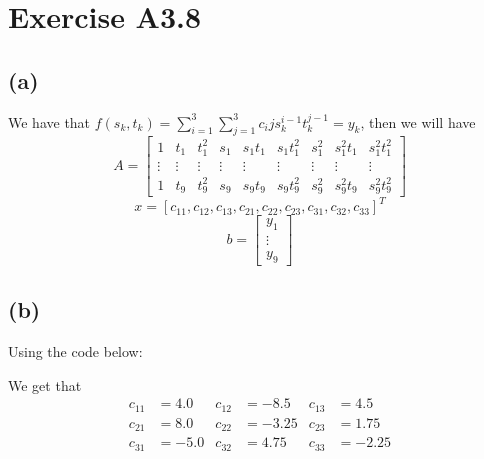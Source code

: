 \section*{Exercise A3.8}
\subsection*{(a)}
We have that $f(s_k,t_k)=\sum_{i=1}^{3}\sum_{j=1}^{3}c_ijs_k^{i-1}t_k^{j-1}=y_k$, then we will have
$$A=\begin{bmatrix}
    1&t_1&t_1^2&s_1&s_1t_1&s_1t_1^2&s_1^2&s_1^2t_1&s_1^2t_1^2\\
    \vdots & \vdots & \vdots & \vdots & \vdots & \vdots & \vdots & \vdots & \vdots\\
    1&t_9&t_9^2&s_9&s_9t_9&s_9t_9^2&s_9^2&s_9^2t_9&s_9^2t_9^2
\end{bmatrix}$$
$$x=[c_11,c_12,c_13,c_21,c_22,c_23,c_31,c_32,c_33]^T$$
$$b=\begin{bmatrix}
    y_1\\
    \vdots\\
    y_9
\end{bmatrix}$$
\subsection*{(b)}
Using the code below:

We get that 
$$\begin{matrix}
    c_{11}&=4.0&c_{12}&=-8.5&c_{13}&=4.5\\
    c_{21}&=8.0&c_{22}&=-3.25&c_{23}&=1.75\\
    c_{31}&=-5.0&c_{32}&=4.75&c_{33}&=-2.25
\end{matrix}$$

